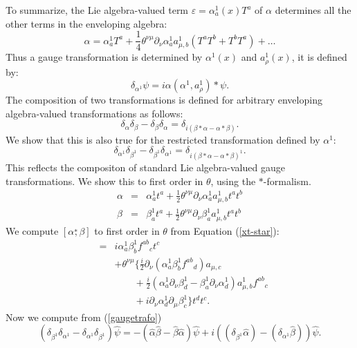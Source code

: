 \documentclass[a4paper,11pt]{article}
\def\nn{\nonumber }
\def\ve{\varepsilon}
\def\ds{\stackrel{*}{,}}
\def\pat{\partial}
\begin{document}
To summarize, the Lie algebra-valued term $\ve=\alpha_a^1(x)T^a$ of $\alpha$  
determines all the other terms in the enveloping algebra: 
\begin{equation}
\label{alph-env}
  \alpha=\alpha^1_aT^a+\frac{1}{4}\theta^{\nu\mu}\pat_{\nu}\alpha^1_aa^1_{\mu,b}(T^aT^b+T^bT^a)+\ldots
\end{equation}
Thus a gauge transformation is determined by $\alpha^1(x)$ and $a^1_{\rho}(x)$, it is defined by:
\begin{equation}
\label{res-gauge-trafo}
  \delta_{\alpha^1}\psi=i\alpha(\alpha^1,a^1_{\rho})*\psi.
\end{equation}
The composition of two transformations is defined for arbitrary 
enveloping algebra-valued transformations as follows:
\begin{equation}
  \delta_{\alpha}\delta_{\beta}-\delta_{\beta}\delta_{\alpha}=\delta_{i(\beta*\alpha-\alpha*\beta)}.
\end{equation}
We show that this is also true for the restricted transformation defined by $\alpha^1$:
\begin{equation}
\label{alph1-komm}
  \delta_{\alpha^1}\delta_{\beta^1}-\delta_{\beta^1}\delta_{\alpha^1}=\delta_{i(\beta*\alpha-\alpha*\beta)^1}.
\end{equation}
This reflects the compositon of standard Lie algebra-valued gauge transformations. 
We show this to first order in $\theta$, using the $*$-formalism.
\begin{eqnarray}
\label{alpha+beta}
  \alpha&=&\alpha^1_at^a+\frac{1}{2}\theta^{\nu\mu}\pat_{\nu}\alpha^1_aa^1_{\mu,b}t^at^b\nn\\
  \beta&=&\beta^1_at^a+\frac{1}{2}\theta^{\nu\mu}\pat_{\nu}\beta^1_aa^1_{\mu,b}t^at^b
\end{eqnarray}
We compute $[\alpha\ds\beta]$ to first order in $\theta$ from Equation (\ref{xt-star}):
\begin{eqnarray}
  [\alpha\ds\beta]&=&i\alpha_a^1\beta^1_bf^{ab}{}_ct^c\nn\\
  &&+\theta^{\nu\mu}\Big\{\frac{i}{2}\pat_{\nu}(\alpha^1_a\beta^1_bf^{ab}{}_{d})a_{\mu,c}\nn\\
  &&\qquad+\frac{i}{2}(\alpha^1_a\pat_{\nu}\beta^1_d-\beta_a^1\pat_{\nu}\alpha_d^1)a^1_{\mu,b}f^{ab}{}_{c}\nn\\
  &&\qquad+i\pat_{\nu}\alpha^1_d\pat_{\mu}\beta^1_c\Big\}t^dt^c.
\end{eqnarray}
Now we compute from (\ref{gaugetrafo}) 
\begin{equation}
  (\delta_{\beta^1}\delta_{\alpha^1}-\delta_{\alpha^1}\delta_{\beta^1})\hat{\psi}=-(\hat{\alpha}\hat{\beta}-\hat{\beta}\hat{\alpha})\hat{\psi}+i((\delta_{\beta^1}\hat{\alpha})-(\delta_{\alpha^1}\hat{\beta}))\hat{\psi}.
\end{equation}
\end{document}
